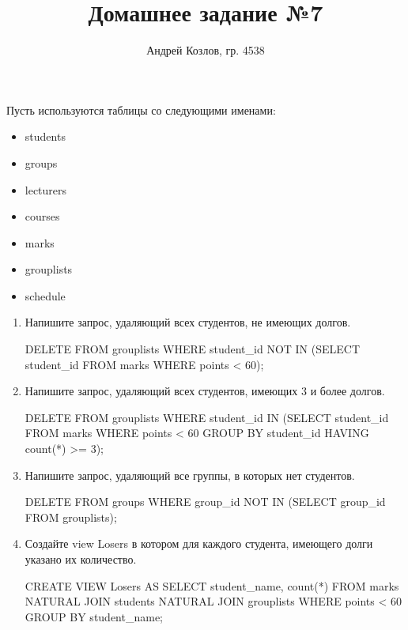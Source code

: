 \documentclass[10pt, a4paper]{article}
\title{Домашнее задание №7}
\author{Андрей Козлов, гр. 4538}
\date{}
\begin{document}
\maketitle

Пусть используются таблицы со следующими именами:
\begin{itemize}
	\item students
	\item groups
	\item lecturers
	\item courses
	\item marks
	\item grouplists
	\item schedule
\end{itemize}

\begin{enumerate}

	\item {Напишите запрос, удаляющий всех студентов, не имеющих долгов.

	\begin{sql}
DELETE FROM grouplists WHERE student_id NOT IN
	(SELECT student_id FROM marks WHERE points < 60);
	\end{sql}
	}

	\item {Напишите запрос, удаляющий всех студентов, имеющих 3 и более долгов.

	\begin{sql}
DELETE FROM grouplists WHERE student_id IN
	(SELECT student_id FROM marks WHERE points < 60
	GROUP BY student_id HAVING count(*) >= 3);
	\end{sql}
	}

	\item {Напишите запрос, удаляющий все группы, в которых нет студентов.

	\begin{sql}
DELETE FROM groups WHERE group_id NOT IN
	(SELECT group_id FROM grouplists);
	\end{sql}
	}

	\item {Создайте view \textsf{Losers} в котором для каждого студента, имеющего долги указано их количество.

	\begin{sql}
CREATE VIEW Losers AS SELECT student_name, count(*) FROM
	marks NATURAL JOIN students NATURAL JOIN grouplists
		WHERE points < 60 GROUP BY student_name;
	\end{sql}
	}


\end{enumerate}
\end{document}
